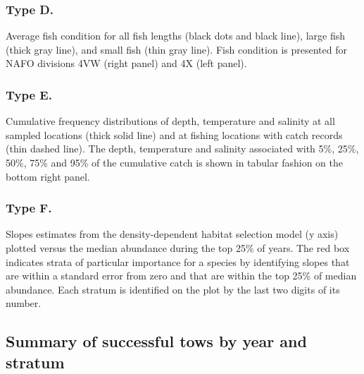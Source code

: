 \documentclass[12pt]{article}\usepackage[]{graphicx}\usepackage[]{color}
\begin{document}
\hypertarget{type-d.}{%
\subsubsection{Type D.}\label{type-d.}}

Average fish condition for all fish lengths (black dots and black line), large fish (thick gray line), and small fish (thin gray line). Fish condition is presented for NAFO divisions 4VW (right panel) and 4X (left panel).

\hypertarget{type-e.}{%
\subsubsection{Type E.}\label{type-e.}}

Cumulative frequency distributions of depth, temperature and salinity at all sampled locations (thick solid line) and at fishing locations with catch records (thin dashed line). The depth, temperature and salinity associated with 5\%, 25\%, 50\%, 75\% and 95\% of the cumulative catch is shown in tabular fashion on the bottom right panel.

\hypertarget{type-f.}{%
\subsubsection{Type F.}\label{type-f.}}

Slopes estimates from the density-dependent habitat selection model (y axis) plotted versus the median abundance during the top 25\% of years. The red box indicates strata of particular importance for a species by identifying slopes that are within a standard error from zero and that are within the top 25\% of median abundance. Each stratum is identified on the plot by the last two digits of its number.

\hypertarget{summary-of-successful-tows-by-year-and-stratum}{%
\subsection{Summary of successful tows by year and stratum}\label{summary-of-successful-tows-by-year-and-stratum}}
\end{document}
